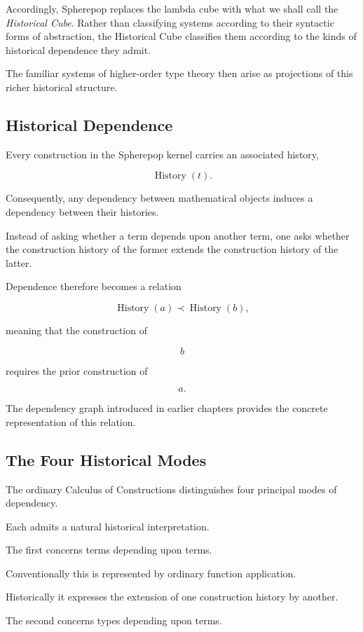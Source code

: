 \documentclass[12pt,oneside]{article}
\theoremstyle{definition}
\theoremstyle{remark}
\DeclareMathOperator{\History}{History}
\begin{document}
Accordingly, Spherepop replaces the lambda cube with what we shall call the
\emph{Historical Cube}. Rather than classifying systems according to their
syntactic forms of abstraction, the Historical Cube classifies them according to
the kinds of historical dependence they admit.

The familiar systems of higher-order type theory then arise as projections of
this richer historical structure.

\subsection{Historical Dependence}

Every construction in the Spherepop kernel carries an associated history,

\[
\History(t).
\]

Consequently, any dependency between mathematical objects induces a dependency
between their histories.

Instead of asking whether a term depends upon another term, one asks whether the
construction history of the former extends the construction history of the
latter.

Dependence therefore becomes a relation

\[
\History(a)
\prec
\History(b),
\]

meaning that the construction of

\[
b
\]

requires the prior construction of

\[
a.
\]

The dependency graph introduced in earlier chapters provides the concrete
representation of this relation.

\subsection{The Four Historical Modes}

The ordinary Calculus of Constructions distinguishes four principal modes of
dependency.

Each admits a natural historical interpretation.

The first concerns terms depending upon terms.

Conventionally this is represented by ordinary function application.

Historically it expresses the extension of one construction history by another.

The second concerns types depending upon terms.
\end{document}
